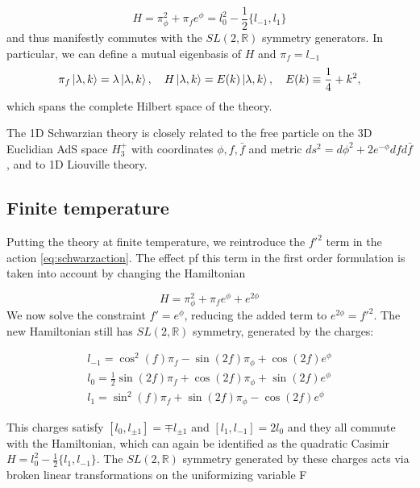 \begin{equation}
H = \pi_\phi^2 + \pi_fe^\phi = l_0^2 - \frac{1}{2}\{l_{-1},l_1\}
\label{eq:Schwarzianhamiltonian}
\end{equation}
and thus manifestly commutes with the $SL(2,\mathbb{R})$ symmetry generators. In particular, we can define a mutual eigenbasis of $H$ and $\pi_f=l_{-1}$
\begin{equation}
\pi_f\ket{\lambda, k} = \lambda\ket{\lambda,k},\quad H\ket{\lambda, k} = E(k)\ket{\lambda, k},\quad E(k)\equiv\frac{1}{4}+k^2,
\label{eq:eigenbasis}
\end{equation}
which spans the complete Hilbert space of the theory.

The 1D Schwarzian theory is closely related to the free particle on the 3D Euclidian AdS space $H^+_3$ with coordinates $\phi,f,\bar{f}$ and metric $ds^2 = d\phi^2 + 2e^{-\phi}dfd\bar{f}$, and to 1D Liouville theory. 

\subsection{Finite temperature}
Putting the theory at finite temperature, we reintroduce the $f'^2$ term in the action \eqref{eq:schwarzaction}. The effect pf this term in the first order formulation is taken into account by changing the Hamiltonian

\begin{equation}
H = \pi_\phi^2 + \pi_fe^\phi + e^{2\phi}
\end{equation}
We now solve the constraint $f' = e^{\phi}$, reducing the added term to $e^{2\phi} = f'^2$. The new Hamiltonian still has $SL(2,\mathbb{R})$ symmetry, generated by the charges:

\begin{align}
l_{-1} = \cos^2(f)\pi_f - \sin(2f)\pi_\phi + \cos(2f)e^\phi\\
l_0 = \frac{1}{2}\sin(2f)\pi_f + \cos(2f)\pi_\phi + \sin(2f)e^\phi\\
l_1 =  \sin^2(f)\pi_f + \sin(2f)\pi_\phi - \cos(2f)e^\phi
\end{align}

This charges satisfy $[l_0,l_{\pm 1}] = \mp l_{\pm 1}$ and $[l_1,l_{-1}] = 2l_0$ and they all commute with the Hamiltonian, which can again be identified as the quadratic Casimir $H = l_0^2 - \frac{1}{2}\{l_1,l_{-1}\}$. The $SL(2,\mathbb{R})$ symmetry generated by these charges acts via broken linear transformations on the uniformizing variable F


